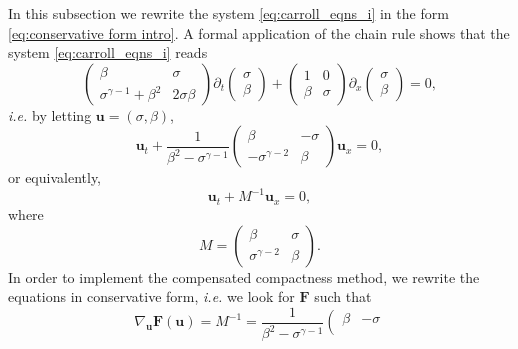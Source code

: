 \documentclass[11pt,a4paper,reqno]{amsart}
\numberwithin{equation}{section}
\theoremstyle{definition}
\theoremstyle{remark}
\newcommand{\bu}{\mathbf{u}}
\newcommand{\bF}{\mathbf{F}}
\begin{document}
{In this subsection we rewrite the system \eqref{eq:carroll_eqns_i} in the form \eqref{eq:conservative form intro}. A formal application of the chain rule shows that the system \eqref{eq:carroll_eqns_i} reads 
\begin{equation*}
    \left( \begin{matrix}
        \beta & \sigma \\ 
        \sigma^{\gamma-1} + \beta^2 & 2\sigma \beta
    \end{matrix} \right) \partial_t \left( \begin{matrix}
        \sigma \\ 
        \beta
    \end{matrix} \right) + \left( \begin{matrix}
        1 & 0 \\ 
        \beta & \sigma
    \end{matrix} \right) \partial_x \left( \begin{matrix}
        \sigma \\ 
        \beta
    \end{matrix} \right) = 0, 
\end{equation*}
\textit{i.e.} by letting $\bu = (\sigma,\beta)$, 
\begin{equation*}
    \bu_t + \frac{1}{\beta^2 - \sigma^{\gamma-1}}\left( \begin{matrix}
        \beta & -\sigma \\ 
        -\sigma^{\gamma-2}  & \beta
    \end{matrix} \right)  \bu_x = 0, 
\end{equation*}
or equivalently, 
\begin{equation*}
    \bu_t + M^{-1}  \bu_x = 0, 
\end{equation*}
where 
\begin{equation*}
    M = \left(\begin{matrix} \beta & \sigma \\ \sigma^{\gamma-2} & \beta \end{matrix} \right). 
\end{equation*}
%
In order to implement the compensated compactness method, we rewrite the equations in conservative form, \textit{i.e.} we look for $\bF$ such that 
\begin{equation}\label{eq:what it needs to be}
    \nabla_\bu \bF(\bu) = M^{-1} = \frac{1}{\beta^2 - \sigma^{\gamma-1}}\left( \begin{matrix}
        \beta & -\sigma \\ 

\end{matrix}
\end{equation}}
\end{document}
